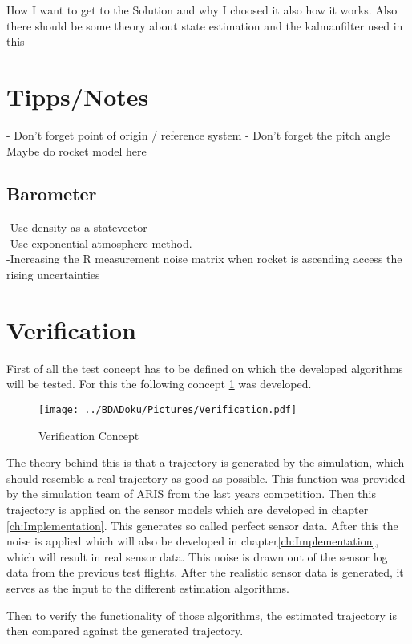 
  How I want to get to the Solution and why I choosed it also how it works.
  Also there should be some theory about state estimation and the kalmanfilter used
  in this
  
  \section{Tipps/Notes}
  - Don't forget point of origin / reference system
  - Don't forget the pitch angle
  Maybe do rocket model here
 
  
  \subsection{Barometer}
  -Use density as a statevector \\
  -Use exponential atmosphere method. \\
  -Increasing the R measurement noise matrix when rocket is ascending access the rising uncertainties
  
  \section{Verification}
  First of all the test concept has to be defined on which the developed algorithms will be tested.
  For this the following concept \ref{fig:Verification} was developed.
  
  \begin{figure}[h!]
   \centering
   \texttt{[image: ../BDADoku/Pictures/Verification.pdf]}
   \caption{Verification Concept}
   \label{fig:Verification}
  \end{figure}

  The theory behind this is that a trajectory is generated by the simulation, which should resemble a real trajectory as good as possible.
  This function was provided by the simulation team of ARIS from the last years competition.
  Then this trajectory is applied on the sensor models which are developed in chapter \ref{ch:Implementation}.
  This generates so called perfect sensor data. 
  After this the noise is applied which will also be developed in chapter\ref{ch:Implementation}, which will result in real sensor data. 
  This noise is drawn out of the sensor log data from the previous test flights.
  After the realistic sensor data is generated, it serves as the input to the different estimation algorithms.
  
  Then to verify the functionality of those algorithms, the estimated trajectory is then compared against the generated trajectory.
  
